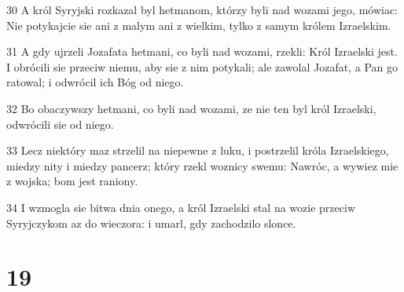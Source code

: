 \par 30 A król Syryjski rozkazal byl hetmanom, którzy byli nad wozami jego, mówiac: Nie potykajcie sie ani z malym ani z wielkim, tylko z samym królem Izraelskim.
\par 31 A gdy ujrzeli Jozafata hetmani, co byli nad wozami, rzekli: Król Izraelski jest. I obrócili sie przeciw niemu, aby sie z nim potykali; ale zawolal Jozafat, a Pan go ratowal; i odwrócil ich Bóg od niego.
\par 32 Bo obaczywszy hetmani, co byli nad wozami, ze nie ten byl król Izraelski, odwrócili sie od niego.
\par 33 Lecz niektóry maz strzelil na niepewne z luku, i postrzelil króla Izraelskiego, miedzy nity i miedzy pancerz; który rzekl woznicy swemu: Nawróc, a wywiez mie z wojska; bom jest raniony.
\par 34 I wzmogla sie bitwa dnia onego, a król Izraelski stal na wozie przeciw Syryjczykom az do wieczora: i umarl, gdy zachodzilo slonce.

\chapter{19}

